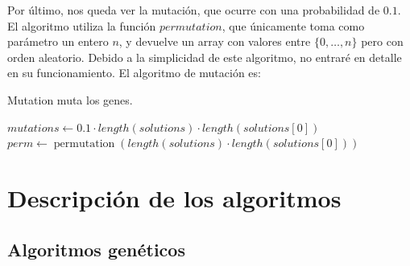 \documentclass[11pt,a4paper]{article}
\begin{document}
Por último, nos queda ver la mutación, que ocurre con una probabilidad de $0.1$. El algoritmo utiliza la función $permutation$, que únicamente toma como parámetro un entero $n$, y devuelve un array con valores entre $\{0, \dots, n\}$ pero con orden aleatorio. Debido a la simplicidad de este algoritmo, no entraré en detalle en su funcionamiento. El algoritmo de mutación es: \\
\begin{algorithm}[H]
	\caption{{\sc Mutation} muta los genes.}
	
	$mutations \gets 0.1 \cdot length(solutions) \cdot length(solutions[0])$ \;
	$perm \gets \operatorname{permutation}(length(solutions) \cdot length(solutions[0]))$ \;
	
	 \;
\end{algorithm}

\newpage
\section{Descripción de los algoritmos}

\subsection{Algoritmos genéticos}
\end{document}
